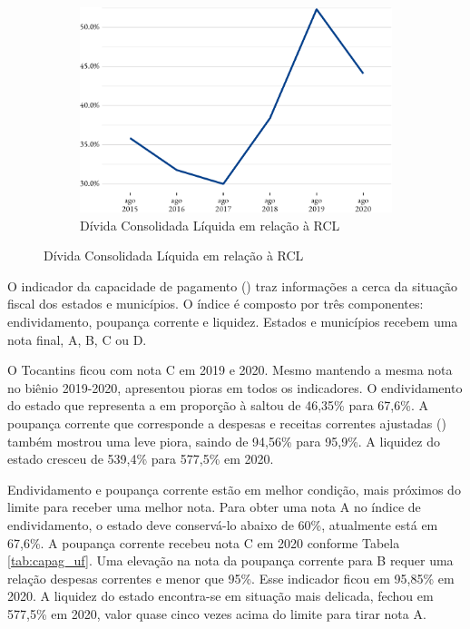 \begin{figure}[!h]
	\begin{subfigure}{\linewidth}
		\caption{\label{fig:divida_rcl}Dívida Consolidada Líquida em relação à RCL}
		\includegraphics{fig/divida_rcl-1.pdf}
	\end{subfigure}
\end{figure}

O indicador da capacidade de pagamento () traz
informações a cerca da situação fiscal dos estados e municípios. O
índice é composto por três componentes: endividamento, poupança corrente
e liquidez. Estados e municípios recebem uma nota final, A, B, C ou D.

O Tocantins ficou com nota C em 2019 e 2020. Mesmo mantendo a mesma nota
no biênio 2019-2020, apresentou pioras em todos os indicadores. O
endividamento do estado que representa a  em proporção à
 saltou de 46,35\% para 67,6\%. A poupança corrente que
corresponde a despesas e receitas correntes ajustadas
() também mostrou uma leve piora, saindo de 94,56\% para
95,9\%. A liquidez do estado cresceu de 539,4\% para 577,5\% em 2020.

Endividamento e poupança corrente estão em melhor condição,
mais próximos do limite para receber uma melhor nota. Para obter uma nota
A no índice de endividamento, o estado deve conservá-lo abaixo de 60\%,
atualmente está em 67,6\%. A poupança corrente recebeu nota C em 2020
conforme Tabela \ref{tab:capag_uf}. Uma elevação na nota da poupança
corrente para B requer uma relação despesas correntes e  menor
que 95\%. Esse indicador ficou em 95,85\% em 2020. A liquidez do estado encontra-se em
situação mais delicada, fechou em 577,5\% em 2020, valor quase cinco
vezes acima do limite para tirar nota A.

